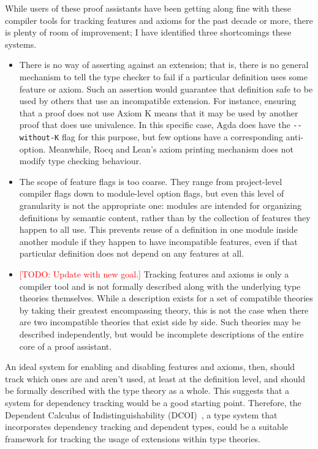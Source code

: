 \documentclass{article}
\newcommand{\note}[1]{\textcolor{red}{[#1]}}
\newcommand{\code}[1]{\texttt{#1}}
\begin{document}
While users of these proof assistants have been getting along fine
with these compiler tools for tracking features and axioms for the past decade or more,
there is plenty of room of improvement;
I have identified three shortcomings these systems.
%
\begin{itemize}
  \item There is no way of asserting against an extension;
    that is, there is no general mechanism to tell the type checker to fail
    if a particular definition uses some feature or axiom.
    Such an assertion would guarantee that definition safe to be used by others
    that use an incompatible extension.
    For instance, ensuring that a proof does not use Axiom K
    means that it may be used by another proof that does use univalence.
    In this specific case, Agda does have the \code{-{}-without-K} flag for this purpose,
    but few options have a corresponding anti-option.
    Meanwhile, Rocq and Lean's axiom printing mechanism
    does not modify type checking behaviour.
  \item The scope of feature flags is too coarse.
    They range from project-level compiler flags
    down to module-level option flags,
    but even this level of granularity is not the appropriate one:
    modules are intended for organizing definitions by semantic content,
    rather than by the collection of features they happen to all use.
    This prevents reuse of a definition in one module inside another module
    if they happen to have incompatible features,
    even if that particular definition does not depend on any features at all.
  \item \note{TODO: Update with new goal.}
    Tracking features and axioms is only a compiler tool
    and is not formally described along with the underlying type theories themselves.
    While a description exists for a set of compatible theories
    by taking their greatest encompassing theory,
    this is not the case when there are two incompatible theories that exist side by side.
    Such theories may be described independently,
    but would be incomplete descriptions of the entire core of a proof assistant.
\end{itemize}

An ideal system for enabling and disabling features and axioms, then,
should track which ones are and aren't used, at least at the definition level,
and should be formally described with the type theory as a whole.
This suggests that a system for dependency tracking would be a good starting point.
Therefore, the Dependent Calculus of Indistinguishability (DCOI)~\citep{dcoi},
a type system that incorporates dependency tracking and dependent types,
could be a suitable framework for tracking the usage of extensions within type theories.
\end{document}
